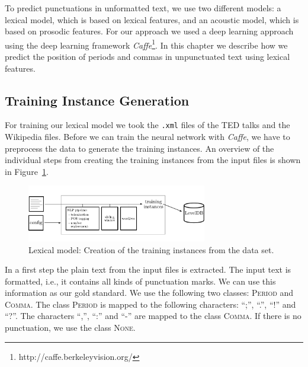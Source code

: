 To predict punctuations in unformatted text, we use two different models: a lexical model, which is based on lexical features, and an acoustic model, which is based on prosodic features.
For our approach we used a deep learning approach using the deep learning framework \emph{Caffe}\footnote{http://caffe.berkeleyvision.org/}.
In this chapter we describe how we predict the position of periods and commas in unpunctuated text using lexical features.

\subsection{Training Instance Generation}
For training our lexical model we took the \texttt{.xml} files of the TED talks and the Wikipedia files.
Before we can train the neural network with \emph{Caffe}, we have to preprocess the data to generate the training instances.
An overview of the individual steps from creating the training instances from the input files is shown in Figure~\ref{fig:overview_lexical}.

\begin{figure}[ht]
    \centering
    \includegraphics[width=0.7\textwidth]{img/overview_lexical.pdf}
    \caption{Lexical model: Creation of the training instances from the data set.}
    \label{fig:overview_lexical}
\end{figure}

In a first step the plain text from the input files is extracted.
The input text is formatted, i.e., it contains all kinds of punctuation marks.
We can use this information as our gold standard.
We use the following two classes: \textsc{Period} and \textsc{Comma}.
The class \textsc{Period} is mapped to the following characters: ``;'', ``.'', ``!'' and ``?''.
The characters ``,'', ``:'' and ``-'' are mapped to the class \textsc{Comma}.
If there is no punctuation, we use the class \textsc{None}.

